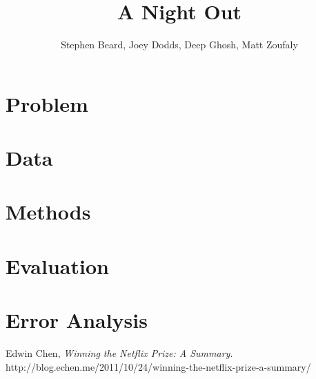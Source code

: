 \documentclass[12pt]{article}
\begin{document}

\title{A Night Out}
\author{Stephen Beard, Joey Dodds, Deep Ghosh, Matt Zoufaly}
\maketitle

\section{Problem}

\newcommand{\bestRMSE}{0.9307 }
\newcommand{\bestK}{48 }
\newcommand{\bestNetflixRMSE}{0.8712 }
\newcommand{\netDiff}{0.06 }

\newcommand{\numBusCA}{707 } 
\newcommand{\numBusTotal}{2,452 }

\newcommand{\numRatingCA}{8,970 } 
\newcommand{\numRatingTotal}{28,310 }

\section{Data}


\section{Methods}


\section{Evaluation}


\section{Error Analysis}


\begin{thebibliography}{9}

  Edwin Chen,
  \emph{Winning the Netflix Prize: A Summary}.
  http://blog.echen.me/2011/10/24/winning-the-netflix-prize-a-summary/
\end{thebibliography}
\end{document}
